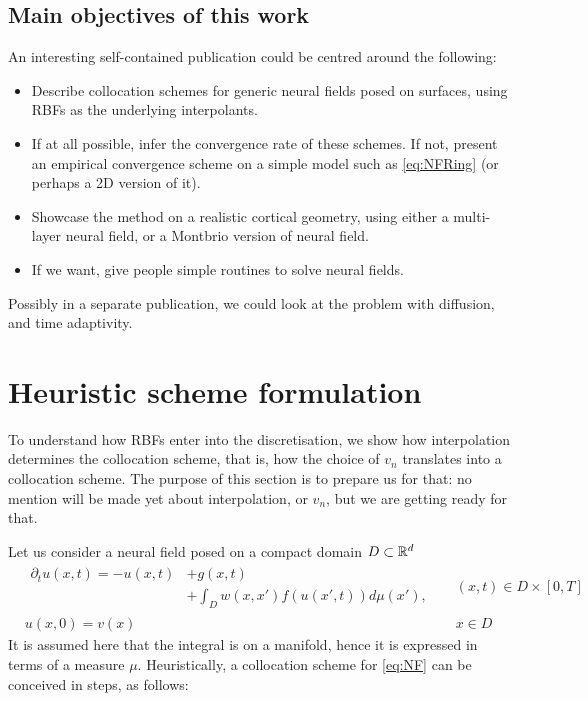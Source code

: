 \documentclass[a4paper]{siamart190516}
\begin{document}
\subsection{Main objectives of this work}\label{ssec:Objectives} An interesting
self-contained publication could be centred around the following:
\begin{itemize}
  \item Describe collocation schemes for generic neural fields posed on surfaces,
    using RBFs as the underlying interpolants.
  \item If at all possible, infer the convergence rate of these schemes. If not,
    present an empirical convergence scheme on a simple model such as
    \cref{eq:NFRing} (or perhaps a 2D version of it).
  \item Showcase the method on a realistic cortical geometry, using either a
    multi-layer neural field, or a Montbrio version of neural field.
  \item If we want, give people simple routines to solve neural fields.
\end{itemize}
Possibly in a separate publication, we could look at the problem with diffusion, and
time adaptivity.

\section{Heuristic scheme formulation}\label{sec:model} To understand how RBFs enter
into the discretisation, we show how interpolation determines the collocation scheme,
that is, how the choice of $v_n$ translates into a collocation scheme. The purpose of
this section is to prepare us for that: no mention will be made yet about
interpolation, or $v_n$, but we are getting ready for that.

Let us consider a neural field posed on
a compact domain $D \subset \mathbb{R}^d$
\begin{equation}\label{eq:NF}
  \begin{aligned}
  &
  \begin{aligned}
    \partial_t u(x,t) =  -u(x,t)  &+ g(x,t) \\
                & + \int_{D} w(x,x') f(u(x',t))d \mu(x'),
  \end{aligned}
  && (x,t) \in D \times [0,T] \\
  & u(x,0) = v(x) && x \in D 
  \end{aligned}
\end{equation}
It is assumed here that the integral is on a manifold, hence it is expressed in terms
of a measure $\mu$. Heuristically, a collocation scheme for \cref{eq:NF} can be conceived
in steps, as follows:
\end{document}
